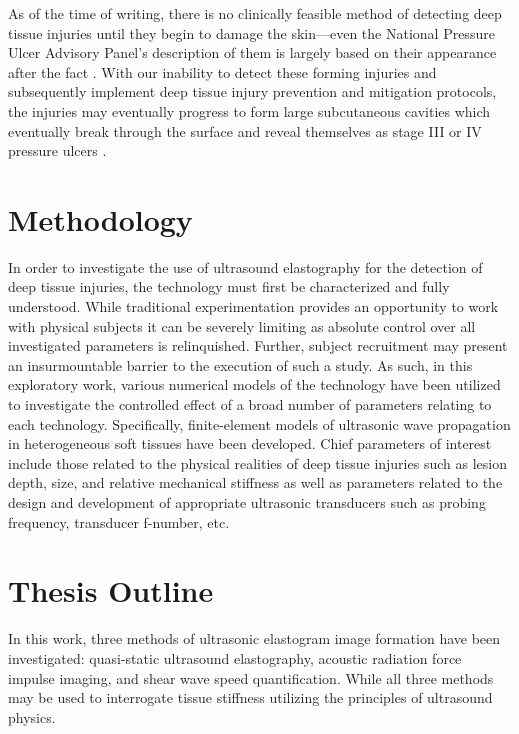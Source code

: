 {		As of the time of writing, there is no clinically feasible method of detecting deep tissue injuries until they begin to damage the skin---even the National Pressure Ulcer Advisory Panel's description of them is largely based on their appearance after the fact \cite{npuap07}. With our inability to detect these forming injuries and subsequently implement deep tissue injury prevention and mitigation protocols, the injuries may eventually progress to form large subcutaneous cavities which eventually break through the surface and reveal themselves as stage III or IV pressure ulcers \cite{bouten03,oomens10}. 

	\section{Methodology}
		In order to investigate the use of ultrasound elastography for the detection of deep tissue injuries, the technology must first be characterized and fully understood. While traditional experimentation provides an opportunity to work with physical subjects it can be severely limiting as absolute control over all investigated parameters is relinquished. Further, subject recruitment may present an insurmountable barrier to the execution of such a study. As such, in this exploratory work, various numerical models of the technology have been utilized to investigate the controlled effect of a broad number of parameters relating to each technology. Specifically, finite-element models of ultrasonic wave propagation in heterogeneous soft tissues have been developed.  Chief parameters of interest include those related to the physical realities of deep tissue injuries such as lesion depth, size, and relative mechanical stiffness as well as parameters related to the design and development of appropriate ultrasonic transducers such as probing frequency, transducer f-number, etc.

	\section{Thesis Outline}
		In this work, three methods of ultrasonic elastogram image formation have been investigated: quasi-static ultrasound elastography, acoustic radiation force impulse imaging, and shear wave speed quantification. While all three methods may be used to interrogate tissue stiffness utilizing the principles of ultrasound physics.}

	\cleardoublepage


	\printbibliography[heading=subbibliography]
